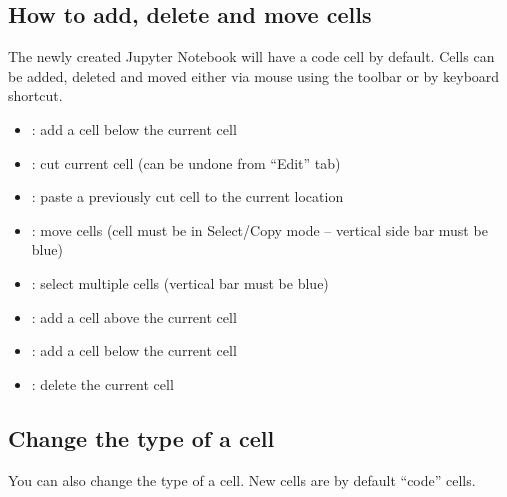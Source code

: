 \documentclass[letterpaper,10pt,english]{jupyterBook}
\begin{document}
\subsection{How to add, delete and move cells}
\label{\detokenize{content/04_PythonEssentials/Intro_Jupyter_notebook:how-to-add-delete-and-move-cells}}
\sphinxAtStartPar
The newly created Jupyter Notebook will have a code cell by default.  Cells can be added, deleted and moved either via mouse using the toolbar or by keyboard shortcut.

\sphinxAtStartPar
{}
\begin{itemize}
\item {} 
\sphinxAtStartPar
{}: add a cell below the current cell

\item {} 
\sphinxAtStartPar
{}: cut  current cell (can be undone from “Edit” tab)

\item {} 
\sphinxAtStartPar
{}: paste a previously cut cell to the current location

\item {} 
\sphinxAtStartPar
{}: move cells (cell must be in Select/Copy mode – vertical side bar must be blue)

\item {} 
\sphinxAtStartPar
{}: select multiple cells (vertical bar must be blue)

\end{itemize}

\sphinxAtStartPar
{}
\begin{itemize}
\item {} 
\sphinxAtStartPar
{}: add a cell above the current cell

\item {} 
\sphinxAtStartPar
{}: add a cell below the current cell

\item {} 
\sphinxAtStartPar
{}: delete the current cell

\end{itemize}


\subsection{Change the type of a cell}
\label{\detokenize{content/04_PythonEssentials/Intro_Jupyter_notebook:change-the-type-of-a-cell}}
\sphinxAtStartPar
You can also change the type of a cell. New cells are by default “code” cells.
\end{document}
